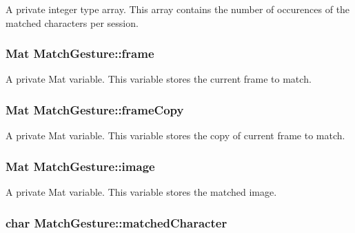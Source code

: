 \label{classMatchGesture_a57ceb174132391f082f42e58eac1866c}
A private integer type array. This array contains the number of occurences of the matched characters per session. \hypertarget{classMatchGesture_acefa626782bb878de7a7394ff7dc80f6}{
\subsubsection[{frame}]{\setlength{\rightskip}{0pt plus 5cm}Mat {\bf MatchGesture::frame}}}
\label{classMatchGesture_acefa626782bb878de7a7394ff7dc80f6}
A private Mat variable. This variable stores the current frame to match. \hypertarget{classMatchGesture_a8e1b515de34fb0746223b42d5497c817}{
\subsubsection[{frameCopy}]{\setlength{\rightskip}{0pt plus 5cm}Mat {\bf MatchGesture::frameCopy}}}
\label{classMatchGesture_a8e1b515de34fb0746223b42d5497c817}
A private Mat variable. This variable stores the copy of current frame to match. \hypertarget{classMatchGesture_abc309df906bffe0bc4050aefbf965d69}{
\subsubsection[{image}]{\setlength{\rightskip}{0pt plus 5cm}Mat {\bf MatchGesture::image}}}
\label{classMatchGesture_abc309df906bffe0bc4050aefbf965d69}
A private Mat variable. This variable stores the matched image. \hypertarget{classMatchGesture_a32a7db9f36bf5d23d764ef57bc467528}{
\subsubsection[{matchedCharacter}]{\setlength{\rightskip}{0pt plus 5cm}char {\bf MatchGesture::matchedCharacter}}}
